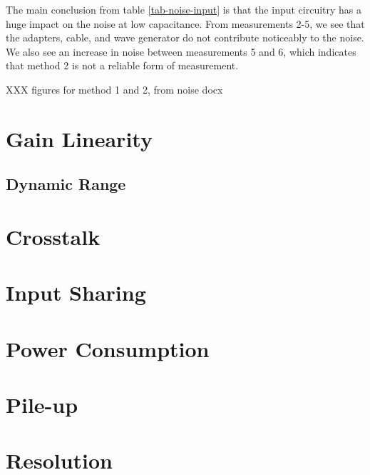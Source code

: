 \documentclass[../main/thesis.tex]{subfiles}
\begin{document}
The main conclusion from table \ref{tab-noise-input} is that the input circuitry has a huge impact on the noise at low capacitance. From measurements 2-5, we see that the adapters, cable, and wave generator do not contribute noticeably to the noise. We also see an increase in noise between measurements 5 and 6, which indicates that method 2 is not a reliable form of measurement. 

XXX figures for method 1 and 2, from noise docx

\section{Gain Linearity}
\label{ide-linearity}

\subsection{Dynamic Range}
\label{ide-dynamicrange}

\section{Crosstalk}
\label{ide-crosstalk}

\section{Input Sharing}
\label{ide-inputshare}

\section{Power Consumption}
\label{ide-power}

\section{Pile-up}
\label{ide-pileup}

\section{Resolution}
\label{ide-resolution}
\end{document}
